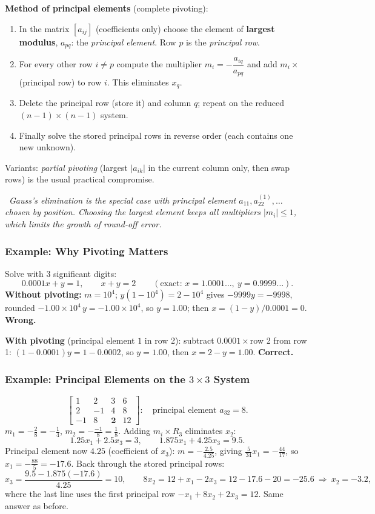 \documentclass[hidelinks]{article}
\newcommand{\callout}[1]{\par\smallskip\noindent{\color{capri}$\blacktriangleright$}\ \textit{#1}\par\smallskip}
\newcommand{\abs}[1]{\left|#1\right|}
\begin{document}
\textbf{Method of principal elements} (complete pivoting):
\begin{enumerate}
    \item In the matrix $[a_{ij}]$ (coefficients only) choose the element of \textbf{largest modulus}, $a_{pq}$: the \emph{principal element}. Row $p$ is the \emph{principal row}.
    \item For every other row $i\neq p$ compute the multiplier $m_i=-\dfrac{a_{iq}}{a_{pq}}$ and add $m_i\times$(principal row) to row $i$. This eliminates $x_q$.
    \item Delete the principal row (store it) and column $q$; repeat on the reduced $(n-1)\times(n-1)$ system.
    \item Finally solve the stored principal rows in reverse order (each contains one new unknown).
\end{enumerate}
Variants: \emph{partial pivoting} (largest $\abs{a_{ik}}$ in the current column only, then swap rows) is the usual practical compromise.

\callout{Gauss's elimination is the special case with principal element $a_{11},a^{(1)}_{22},\dots$ chosen by position. Choosing the largest element keeps all multipliers $\abs{m_i}\le1$, which limits the growth of round-off error.}

\subsubsection{Example: Why Pivoting Matters}

Solve with 3 significant digits:
\[
0.0001x+y=1,\qquad x+y=2\qquad(\text{exact: }x=1.0001\ldots,\ y=0.9999\ldots).
\]
\textbf{Without pivoting:} $m=10^4$; $y(1-10^4)=2-10^4$ gives $-9999y=-9998$, rounded $-1.00\times10^4\,y=-1.00\times10^4$, so $y=1.00$; then $x=(1-y)/0.0001=0$. \textbf{Wrong.}

\textbf{With pivoting} (principal element $1$ in row 2): subtract $0.0001\times$row 2 from row 1: $(1-0.0001)y=1-0.0002$, so $y=1.00$, then $x=2-y=1.00$. \textbf{Correct.}

\subsubsection{Example: Principal Elements on the $3\times3$ System}

\[
\left[\begin{array}{rrr|r}1&2&3&6\\2&-1&4&8\\-1&8&\mathbf 2&12\end{array}\right]:\quad
\text{principal element } a_{32}=8 .
\]
$m_1=-\frac28=-\frac14$, $m_2=-\frac{-1}{8}=\frac18$. Adding $m_i\times R_3$ eliminates $x_2$:
\[
1.25x_1+2.5x_3=3,\qquad 1.875x_1+4.25x_3=9.5 .
\]
Principal element now $4.25$ (coefficient of $x_3$): $m=-\frac{2.5}{4.25}$, giving $\frac{5}{34}x_1=-\frac{44}{17}$, so $x_1=-\frac{88}{5}=-17.6$. Back through the stored principal rows:
\[
x_3=\frac{9.5-1.875(-17.6)}{4.25}=10,\qquad
8x_2=12+x_1-2x_3=12-17.6-20=-25.6\ \Rightarrow\ x_2=-3.2,
\]
where the last line uses the first principal row $-x_1+8x_2+2x_3=12$. Same answer as before.
\end{document}
